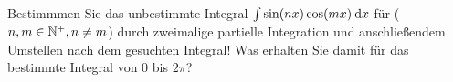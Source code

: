 \item Bestimmmen Sie das unbestimmte Integral $\int \sin(nx)\cos(mx)\:\mathrm{d}{x}$ für ($n,m\in\mathbb{N}^{+}, n \ne m$) durch zweimalige partielle Integration und anschließendem Umstellen nach dem gesuchten Integral! Was erhalten Sie damit für das bestimmte Integral von $0$ bis $2\pi$? 